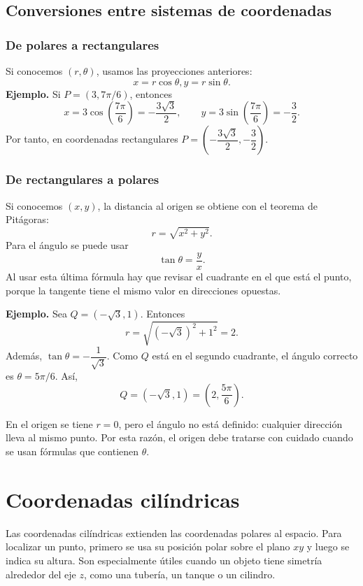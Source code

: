 \subsection{Conversiones entre sistemas de coordenadas}

\subsubsection*{De polares a rectangulares}

Si conocemos $(r,\theta)$, usamos las proyecciones anteriores:
\[
\boxed{x=r\cos\theta, y=r\sin\theta.}
\]
\textbf{Ejemplo.} Si $P=(3,7\pi/6)$, entonces
\[
x=3\cos\left(\frac{7\pi}{6}\right)=-\frac{3\sqrt{3}}{2},
\qquad
y=3\sin\left(\frac{7\pi}{6}\right)=-\frac{3}{2}.
\]
Por tanto, en coordenadas rectangulares $P=\left(-\dfrac{3\sqrt{3}}{2},-\dfrac{3}{2}\right)$.

\subsubsection*{De rectangulares a polares}

Si conocemos $(x,y)$, la distancia al origen se obtiene con el teorema de Pitágoras:
\[
\boxed{r=\sqrt{x^2+y^2}.}
\]
Para el ángulo se puede usar
\[
\tan\theta=\frac{y}{x}.
\]
Al usar esta última fórmula hay que revisar el cuadrante en el que está el punto, porque la tangente tiene el mismo valor en direcciones opuestas.

\textbf{Ejemplo.} Sea $Q=(-\sqrt{3},1)$. Entonces
\[
r=\sqrt{(-\sqrt{3})^2+1^2}=2.
\]
Además, $\tan\theta=-\dfrac{1}{\sqrt{3}}$. Como $Q$ está en el segundo cuadrante, el ángulo correcto es $\theta=5\pi/6$. Así,
\[
Q=(-\sqrt{3},1)=\left(2,\frac{5\pi}{6}\right).
\]

En el origen se tiene $r=0$, pero el ángulo no está definido: cualquier dirección lleva al mismo punto. Por esta razón, el origen debe tratarse con cuidado cuando se usan fórmulas que contienen $\theta$.

\section{Coordenadas cilíndricas}

Las coordenadas cilíndricas extienden las coordenadas polares al espacio. Para localizar un punto, primero se usa su posición polar sobre el plano $xy$ y luego se indica su altura. Son especialmente útiles cuando un objeto tiene simetría alrededor del eje $z$, como una tubería, un tanque o un cilindro.

